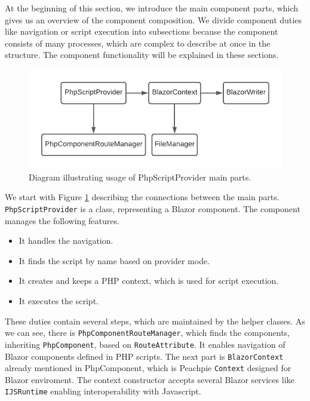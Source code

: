 At the beginning of this section, we introduce the main component parts, which gives us an overview of the component composition.
We divide component duties like navigation or script execution into subsections because the component consists of many processes, which are complex to describe at once in the structure.
The component functionality will be explained in these sections.
\par
\begin{figure}[b]\centering
\includegraphics[scale=0.8]{./img/PhpScriptProvider}
\caption{Diagram illustrating usage of PhpScriptProvider main parts.}
\label{img18:provider}
\end{figure}
\par
We start with Figure \ref{img18:provider} describing the connections between the main parts.
\texttt{PhpScriptProvider} is a class, representing a Blazor component.
The component manages the following features.
\par
\begin{itemize}
\item It handles the navigation.
\item It finds the script by name based on provider mode.
\item It creates and keeps a PHP context, which is used for script execution.
\item It executes the script.
\end{itemize}
\par
These duties contain several steps, which are maintained by the helper classes.
As we can see, there is \texttt{PhpComponentRouteManager}, which finds the components, inheriting \texttt{PhpComponent}, based on \texttt{RouteAttribute}.
It enables navigation of Blazor components defined in PHP scripts.
The next part is \texttt{BlazorContext} already mentioned in PhpComponent, which is Peachpie \texttt{Context} designed for Blazor enviroment.
The context constructor accepts several Blazor services like \texttt{IJSRuntime} enabling interoperability with Javascript.
